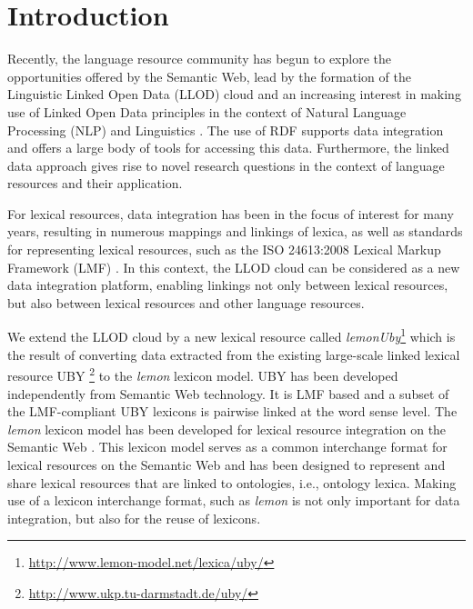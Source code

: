 \section{Introduction}

\noindent Recently, the language resource community has begun to explore the opportunities offered by the Semantic
Web, lead by the formation of the Linguistic Linked Open Data (LLOD) cloud
and an increasing interest in making use of Linked Open Data principles in the context
of Natural Language Processing (NLP) and Linguistics  \cite{chiarcos2012linked}.
The use of RDF supports data integration and offers a large body of tools for accessing this data.
Furthermore, the linked data approach gives rise to novel research questions in the context of
language resources and their application.

 For lexical resources, data integration has been in
 the focus of interest for many years, resulting in numerous mappings and linkings of lexica, as well as
standards for representing lexical resources, such as the ISO 24613:2008 Lexical Markup Framework
(LMF) \cite{francopoulo2006lexical}. In this context, the LLOD cloud can be considered as a new data integration platform, enabling
linkings not only between lexical resources, but also between lexical resources and
other language resources.

We extend the LLOD cloud by a new lexical resource called \emph{le\-mon\-U\-by}\footnote{\url{http://www.lemon-model.net/lexica/uby/}}
which is
 the result of converting data extracted from the existing large-scale linked lexical resource UBY
 \cite{gurevych2012uby}\footnote{\url{http://www.ukp.tu-darmstadt.de/uby/}} to
 the \emph{lemon} lexicon model.
UBY has been developed independently from Semantic Web technology. It is LMF based
and a subset of the LMF-compliant UBY lexicons is pairwise linked at the word sense level.
The \emph{lemon} lexicon model has been developed for lexical resource integration on the Semantic Web
\cite{mccrae2012interchanging}.
This lexicon model serves as a common interchange format for lexical resources on the Semantic Web
and has been designed to represent and share lexical resources that are linked to ontologies, i.e., ontology lexica.
Making use of a lexicon interchange format, such as \emph{lemon} is not only important for data integration,
but also for the reuse of lexicons.


